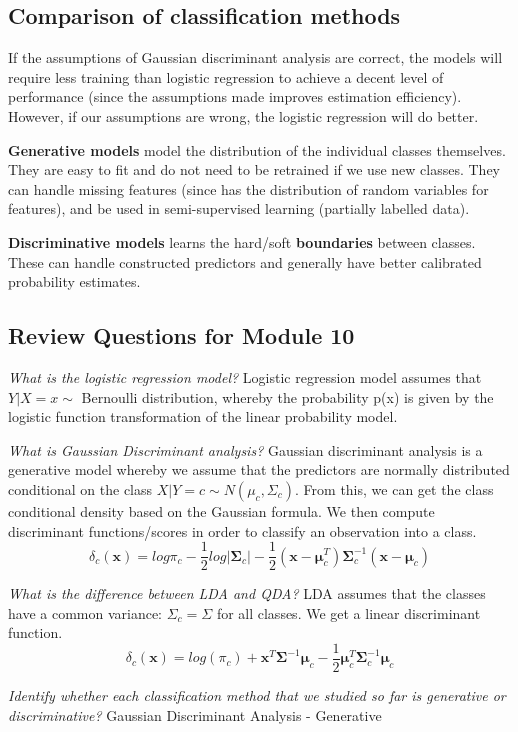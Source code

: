 \documentclass[11pt, oneside]{article}
\theoremstyle{definition}
\begin{document}
\subsection{Comparison of classification methods}
If the assumptions of Gaussian discriminant analysis are correct, the models will require less training than logistic regression to achieve a decent level of performance (since the assumptions made improves estimation efficiency). However, if our assumptions are wrong, the logistic regression will do better.

\textbf{Generative models} model the distribution of the individual classes themselves. They are easy to fit and do not need to be retrained if we use new classes. They can handle missing features (since has the distribution of random variables for features), and be used in semi-supervised learning (partially labelled data).

\textbf{Discriminative models} learns the hard/soft \textbf{boundaries} between classes. These can handle constructed predictors and generally have better calibrated probability estimates.

\subsection{Review Questions for Module 10}
\textit{What is the logistic regression model?} Logistic regression model assumes that $Y|X=x \sim$ Bernoulli distribution, whereby the probability p(x) is given by the logistic function transformation of the linear probability model.

\textit{What is Gaussian Discriminant analysis?}
Gaussian discriminant analysis is a generative model whereby we assume that the predictors are normally distributed conditional on the class $X|Y = c \sim N(\mu_c, \Sigma_c)$. From this, we can get the class conditional density based on the Gaussian formula. We then compute discriminant functions/scores in order to classify an observation into a class.
$$
\delta_c(\bm{x}) = log\pi_c - \frac{1}{2}log|\bm{\Sigma}_c| - \frac{1}{2}(\bm{x} - \bm{\mu}_c^T)\bm{\Sigma}_c^{-1}(\bm{x}-\bm{\mu}_c)
$$

\textit{What is the difference between LDA and QDA?} LDA assumes that the classes have a common variance: $\Sigma_c = \Sigma$ for all classes. We get a linear discriminant function.
$$
\delta_c(\bm{x}) = log(\pi_c) + \bm{x}^T\bm{\Sigma}^{-1}\bm{\mu}_c - \frac{1}{2}\bm{\mu}_c^T\bm{\Sigma}_c^{-1}\bm{\mu}_c
$$

\textit{Identify whether each classification method that we studied so far is generative or discriminative?}
Gaussian Discriminant Analysis - Generative
\end{document}

